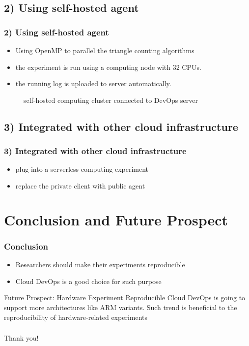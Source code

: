 \documentclass[notheorems]{beamer}
\begin{document}
\subsection{2) Using self-hosted agent}
\begin{frame}
\frametitle{2) Using self-hosted agent}
\begin{itemize}
\item Using OpenMP to parallel the triangle counting algorithms
\item the experiment is run using a computing node with 32 CPUs.
\item the running log is uploaded to server automatically.
\end{itemize}
\begin{figure}
\caption{self-hosted computing cluster connected to DevOps server}
\end{figure}
\end{frame}
\subsection{3) Integrated with other cloud infrastructure}
\begin{frame}
\frametitle{3) Integrated with other cloud infrastructure}
\begin{itemize}
\item plug into a serverless computing experiment
\item replace the private client with public agent
\end{itemize}
\begin{figure}
\end{figure}
\end{frame}
\section{Conclusion and Future Prospect}
\begin{frame}
\frametitle{Conclusion}
\begin{itemize}
\item Researchers should make their experiments reproducible
\item Cloud DevOps is a good choice for such purpose
\end{itemize}
\begin{block}{Future Prospect: Hardware Experiment Reproducible}
Cloud DevOps is going to support more architectures like ARM variants.
Such trend is beneficial to the reproducibility of hardware-related experiments
\end{block}
\end{frame}

\begin{frame}
\frametitle{}
\begin{block}{}
\centering
{\Huge Thank you!}
\end{block}
\end{frame}
\end{document}
